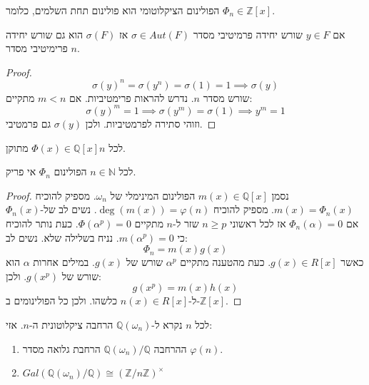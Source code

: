 \documentclass{tstextbook}
\begin{document}
\begin{proposition}
הפולינום הציקלוטומי הוא פולינום תחת השלמים, כלומר \(\Phi_{n}\in \mathbb{Z}[x]\).

\end{proposition}
\begin{proposition}
אם \(y \in F\) שורש יחידה פרמיטיבי מסדר \(\sigma \in Aut(F)\) אז \(\sigma(F)\) הוא גם שורש יחידה פרימיטיבי מסדר \(n\).

\end{proposition}
\begin{proof}
$$\sigma (y)^n=\sigma(y^n)=\sigma(1)=1\implies \sigma(y)$$
שורש מסדר \(n\). נדרש להראות פרימטיביות. אם \(m<n\) מתקיים:
$$\sigma(y)^m = 1\implies \sigma(y^m)=\sigma(1)\implies y^m = 1 $$
וזוהי סתירה לפרמטיביות. ולכן \(\sigma(y)\) גם פרמטיבי.

\end{proof}
\begin{proposition}
לכל \(n\)\(\Phi(x) \in \mathbb{Q} [x]\) מתוקן.

\end{proposition}
\begin{proposition}
לכל \(n \in \mathbb{N}\) הפולינום \(\Phi_{n}\) אי פריק.

\end{proposition}
\begin{proof}
נסמן \(m(x)\in \mathbb{Q}[x]\) הפולינום המינימלי של \(\omega_{n}\). מספיק להוכיח \(m(x)=\Phi_{n}(x)\). מספיק להוכיח \(\deg(m(x))=\varphi(n)\).
נשים לב של-\(\Phi_{n}(x)\)  אם \(\Phi_{n}\left( \alpha \right)=0\) אז לכל ראשוני \(n\geq p\) שזר ל-\(n\) מתקיים \(\Phi\left( \alpha^p \right)=0\).
כעת נותר להוכיח כי \(m\left( \alpha^p \right)=0\). נניח בשלילה שלא. נשים לב:
$$\Phi_{n}=m(x)g(x)$$
כאשר \(g(x) \in R[x]\). כעת מהטענה מתקיים \(\alpha^p\) שורש של \(g(x)\). במילים אחרות \(\alpha\) הוא שורש של \(g(x^p)\). ולכן:
$$g(x^p)=m(x)h(x)$$
ל-\(n(x) \in R[x]\) כלשהו. ולכן כל הפולינומים ב-\(\mathbb{Z}[x]\). 

\end{proof}
\begin{proposition}
לכל \(n\) נקרא ל-\(\mathbb{Q}\left( \omega_{n} \right)\) הרחבה ציקלוטונית ה-\(n\). אזי:

  \begin{enumerate}
    \item ההרחבה \(\mathbb{Q}\left( \omega_{n} \right) / \mathbb{Q}\) הרחבת גלואה מסדר \(\varphi(n)\). 


    \item \(Gal\left( \mathbb{Q} \left( \omega_{n} \right) / \mathbb{Q}  \right) \cong  \left( \mathbb{Z} / n \mathbb{Z} \right)^\times\)


  \end{enumerate}
\end{proposition}
\end{document}
